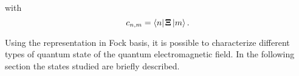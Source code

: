         with
        \begin{equation*}
            c_{n,m}=\bra{n}\pmb{\Xi}\ket{m}.
        \end{equation*}

        Using the representation in Fock basis, it is possible to characterize different types
        of quantum state of the quantum electromagnetic field. In the following section the 
        states studied are briefly described.
